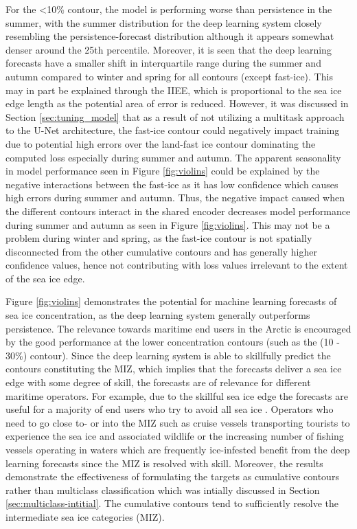 \documentclass[../main/thesis]{subfiles}
\begin{document}
For the <10\% contour, the model is performing worse than persistence in the summer, with the summer distribution for the deep learning system closely resembling the persistence-forecast distribution although it appears somewhat denser around the 25th percentile. Moreover, it is seen that the deep learning forecasts have a smaller shift in interquartile range during the summer and autumn compared to winter and spring for all contours (except fast-ice). This may in part be explained through the IIEE, which is proportional to the sea ice edge length \cite{Goessling2016} as the potential area of error is reduced. However, it was discussed in Section \ref{sec:tuning_model} that as a result of not utilizing a multitask approach to the U-Net architecture, the fast-ice contour could negatively impact training due to potential high errors over the land-fast ice contour dominating the computed loss especially during summer and autumn. The apparent seasonality in model performance seen in Figure \ref{fig:violins} could be explained by the negative interactions between the fast-ice as it has low confidence which causes high errors during summer and autumn. Thus, the negative impact caused when the different contours interact in the shared encoder decreases model performance during summer and autumn as seen in Figure \ref{fig:violins}. This may not be a problem during winter and spring, as the fast-ice contour is not spatially disconnected from the other cumulative contours and has generally higher confidence values, hence not contributing with loss values irrelevant to the extent of the sea ice edge.

Figure \ref{fig:violins} demonstrates the potential for machine learning forecasts of sea ice concentration, as the deep learning system generally outperforms persistence. The relevance towards maritime end users in the Arctic is encouraged by the good performance at the lower concentration contours (such as the (10 - 30\%) contour). Since the deep learning system is able to skillfully predict the contours constituting the MIZ, which implies that the forecasts deliver a sea ice edge with some degree of skill, the forecasts are of relevance for different maritime operators. For example, due to the skillful sea ice edge the forecasts are useful for a majority of end users who try to avoid all sea ice \citep{Wagner2020, Veland2021}. Operators who need to go close to- or into the MIZ such as cruise vessels transporting tourists to experience the sea ice and associated wildlife \citep{Palma2019} or the increasing number of fishing vessels operating in waters which are frequently ice-infested \citep{Stocker2020} benefit from the deep learning forecasts since the MIZ is resolved with skill. Moreover, the results demonstrate the effectiveness of formulating the targets as cumulative contours rather than multiclass classification which was intially discussed in Section \ref{sec:multiclass-intitial}. The cumulative contours tend to sufficiently resolve the intermediate sea ice categories (MIZ).
\end{document}

